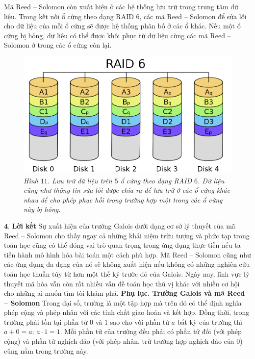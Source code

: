 \begin{multicols}{2}
\begin{figure}[H]
		\vspace*{-10pt}
	\end{figure}
	Mã Reed -- Solomon còn xuất hiện ở các hệ thống lưu trữ trong trung tâm dữ liệu. Trong kết nối ổ cứng theo dạng RAID $6$, các mã Reed -- Solomon để sửa lỗi cho dữ liệu của mỗi ổ cứng sẽ được hệ thống phân bố ở các ổ khác. Nếu một ổ cứng bị hỏng, dữ liệu có thể được khôi phục từ dữ liệu cùng các mã Reed -- Solomon ở trong các ổ cứng còn lại. 
	\begin{figure}[H]
		\vspace*{-5pt}
		\centering
		\captionsetup{labelformat= empty, justification=centering}
		\includegraphics[width= 1\linewidth]{19}
		\caption{\small\textit{\color{toanhocdoisong}Hình $11$. Lưu trữ dữ liệu trên $5$ ổ cứng theo dạng RAID $6$. Dữ liệu cũng như thông tin sửa lỗi được chia ra để lưu trữ ở các ổ cứng khác nhau để cho phép phục hồi trong trường hợp một trong các ổ cứng này bị hỏng.}}
		\vspace*{-10pt}
	\end{figure}
	$\pmb{4.}$ \textbf{\color{toanhocdoisong}\color{toanhocdoisong}Lời kết}
	\vskip 0.05cm
	Sự xuất hiện của trường Galois dưới dạng cơ sở lý thuyết của mã Reed -- Solomon cho thấy ngay cả những khái niệm trừu tượng và phức tạp trong toán học cũng có thể đóng vai trò quan trọng trong ứng dụng thực tiễn nếu ta tiến hành mô hình hóa bài toán một cách phù hợp. Mã Reed -- Solomon cũng như các ứng dụng đa dạng của nó sẽ không xuất hiện nếu không có những nghiên cứu toán học thuần túy từ hơn một thế kỷ trước đó của Galois. Ngày nay, lĩnh vực lý thuyết mã hóa vẫn còn rất nhiều vấn đề toán học thú vị khác với nhiều cơ hội cho những ai muốn tìm tòi khám phá.
	\vskip 0.05cm
	\textbf{\color{toanhocdoisong}Phụ lục. Trường Galois và mã Reed -- Solomon}
	\vskip 0.05cm
	Trong đại số, trường là một tập hợp mà trên đó có thể định nghĩa phép cộng và phép nhân với các tính chất giao hoán và kết hợp. Đồng thời, trong trường phải tồn tại phần tử $0$ và $1$ sao cho với phần tử $a$ bất kỳ của trường thì $a+0=a$; $a\cdot1=1$. Mỗi phần tử của trường đều phải có phần tử đối (với phép cộng) và phần tử nghịch đảo (với phép nhân, trừ trường hợp nghịch đảo của $0$) cũng nằm trong trường này.

\end{multicols}
